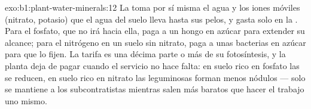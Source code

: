 \begin{solution}{exo:b1:plant-water-minerals:12}
La  toma por sí misma el agua y los iones móviles (nitrato, potasio) que
el agua del suelo lleva hasta sus pelos, y gasta  solo en la . Para el fosfato, que no irá hacia ella, paga a un hongo en azúcar
para extender su alcance; para el nitrógeno en un suelo sin nitrato, paga a
unas bacterias en azúcar para que lo fijen. La tarifa es una décima parte o
más de su fotosíntesis, y la planta deja de pagar cuando el servicio no hace
falta: en suelo rico en fosfato las  se reducen, en suelo rico en
nitrato las leguminosas forman menos nódulos --- solo se mantiene a los
subcontratistas mientras salen más baratos que hacer el trabajo uno mismo.
\end{solution}

